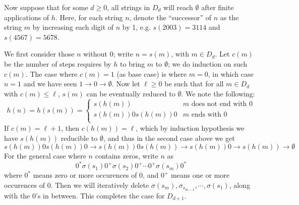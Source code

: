 \documentclass[11pt,a4paper]{article}
\begin{document}
\begin{enumerate}
        Now suppose that for some $d\ge 0$, all strings in $D_d$ will reach $\emptyset$ after finite applications of $h$. 
        Here, for each string $n$, denote the ``successor'' of $n$ as the string $m$ by increasing each digit of $n$ by 1, 
        e.g. $s(2003)=3114$ and $s(4567)=5678$. 
        
        We first consider those $n$ without 0; write $n = s(m)$, with $m\in D_d$. 
        Let $c(m)$ be the number of steps requires by $h$ to bring $m$ to $\emptyset$; we do induction on such $c(m)$. 
        The case where $c(m)=1$ (as base case) is where $m = 0$, in which case $n=1$ and we have seen $1\to 0\to \emptyset$. 
        Now let $\ell\ge 0$ be such that for all $m\in D_d$ with $c(m)\le \ell$, 
        $s(m)$ can be eventually reduced to $\emptyset$. 
        We note the following: 
        \[
        h(n) = h(s(m)) = 
        \begin{cases}
        	s(h(m)) & \text{$m$ does not end with 0}\\
        	s(h(m))0s(h(m))0 & \text{$m$ ends with 0}\\
        \end{cases}
        \]
        If $c(m)=\ell+1$, then $c(h(m))=\ell$, which by induction hypothesis we have $s(h(m))$ reducible to $\emptyset$, 
        and thus in the second case above we get 
        \[
        s(h(m))0s(h(m))0 \to s(h(m))0 s(h(m))\to s(h(m))0 \to s(h(m))\to\emptyset
        \]
        For the general case where $n$ contains zeros, write $n$ as 
        \[
        0^*\sigma(s_1)0^+\sigma(s_2)0^+\cdots 0^+\sigma(s_m) 0^*
        \]
        where $0^*$ means zero or more occurences of 0, and $0^+$ means one or more occurences of 0.
        Then we will iteratively delete $\sigma(s_m), \sigma_{s_{m-1}}, \cdots, \sigma(s_1)$, along with the 0's in between. 
        This completes the case for $D_{d+1}$. 
    \end{enumerate}
    
\end{document}
